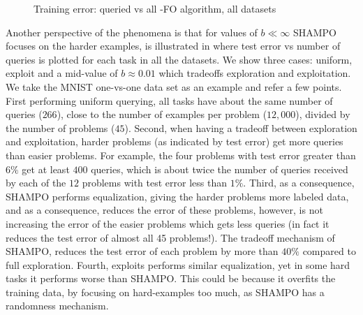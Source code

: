 \begin{figure}[!htb]
\begin{centering}
\caption{Training error: queried vs all -FO algorithm, all datasets}
\label{fig:queried}
\end{centering}
\end{figure}


Another perspective of the phenomena is that for values of $b\ll \infty$ SHAMPO focuses on the harder 
examples, is illustrated in  where test error vs number of queries is plotted for each 
task in all the datasets. We show three cases: uniform, exploit and a mid-value of $b\approx 0.01$ which 
tradeoffs exploration and exploitation. We take the MNIST one-vs-one data set as an example and 
refer a few points. First performing uniform querying, all 
tasks have about the same number of queries ($266$), close to the number of examples per problem 
($12,000$), divided by the number of problems ($45$). Second, when having a tradeoff between exploration 
and exploitation, harder problems (as indicated by test error) get more queries than easier problems. 
For example, the four problems with test error greater than $6\%$ get at least $400$ queries, which is 
about twice the number of queries received by each of the $12$ problems with test error less than $1\%$. 
Third, as a consequence, SHAMPO performs equalization, giving the harder problems more labeled data, 
and as a consequence, reduces the error of these problems, however, is not increasing the error of the 
easier problems which gets less queries (in fact it reduces the test error of almost all 45 problems!). 
The tradeoff mechanism of SHAMPO, reduces the test error of each problem by more than $40\%$ 
compared to full exploration. Fourth, exploits performs similar equalization, yet in some hard tasks it 
performs worse than SHAMPO. This could be because it overfits the training data, by focusing on 
hard-examples too much, as SHAMPO has a randomness mechanism.



